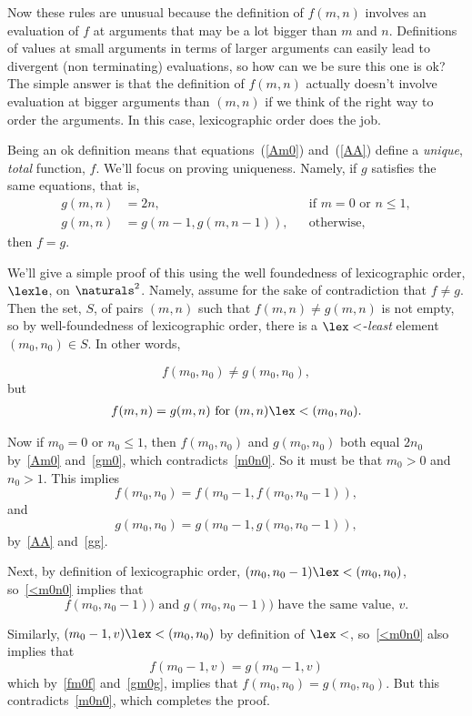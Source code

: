 Now these rules are unusual because the definition of $f(m,n)$ involves an
evaluation of $f$ at arguments that may be a lot bigger than $m$ and $n$.
Definitions of values at small arguments in terms of larger arguments can
easily lead to divergent (non terminating) evaluations, so how can we be
sure this one is ok?  The simple answer is that the definition of $f(m,n)$
actually doesn't involve evaluation at bigger arguments than $(m,n)$ if we
think of the right way to order the arguments.  In this case,
lexicographic order does the job.

Being an ok definition means that equations~(\ref{Am0}) and~(\ref{AA})
define a \emph{unique}, \emph{total} function, $f$.  We'll focus on
proving uniqueness.  Namely, if $g$ satisfies the same equations, that is,
\begin{align}
g(m,n) &=  2n, &&\text{if $m=0$ or $n \le 1$},\label{gm0}\\ 
g(m,n) &=  g(m-1,g(m,n-1)), &&\text{otherwise},\label{gg}
\end{align}
then $f=g$.

We'll give a simple proof of this using the well foundedness of
lexicographic order, $\lexle$, on $\naturals^2$.  Namely, assume for the
sake of contradiction that $f \neq g$.  Then the set, $S$, of pairs
$(m,n)$ such that $f(m,n) \ne g(m,n)$ is not empty, so by well-foundedness
of lexicographic order, there is a $\lex<$-\emph{least} element $(m_0,n_0)
\in S$.  In other words,

\begin{equation}\label{m0n0}
f(m_0,n_0) \neq g(m_0,n_0),
\end{equation}
but
\begin{eqnarray}\label{<m0n0}
f(m,n) = g(m,n) \text{ for } (m,n) \lex< (m_0,n_0).
\end{eqnarray}

Now if $m_0 = 0$ or $n_0 \le 1$, then $f(m_0,n_0)$ and $g(m_0,n_0)$ both
equal $2n_0$ by~\eqref{Am0} and~\eqref{gm0}, which
contradicts~\eqref{m0n0}.  So it must be that $m_0 >0$ and $n_0 > 1$.
This implies
\begin{equation}\label{fm0f}
f(m_0,n_0) = f(m_0-1,f(m_0,n_0-1)),
\end{equation}
and
\begin{equation}\label{gm0g}
g(m_0,n_0) = g(m_0-1,g(m_0,n_0-1)),
\end{equation}
by~\eqref{AA} and~\eqref{gg}.

Next, by definition of lexicographic order, $(m_0,n_0-1) \lex< (m_0,n_0)$,
so~\eqref{<m0n0} implies that
\[f(m_0,n_0-1)) \text{ and } g(m_0,n_0-1))\text{ have the same value, } v.
\]

Similarly, $(m_0-1,v)\lex< (m_0,n_0)$ by definition of $\lex<$,
so~\eqref{<m0n0} also implies that
\begin{equation}
f(m_0-1,v) = g(m_0-1,v)
\end{equation}
which by~\eqref{fm0f} and~\eqref{gm0g}, implies that $f(m_0,n_0) =
g(m_0,n_0)$.  But this contradicts~\eqref{m0n0}, which completes the
proof.


\endinput
